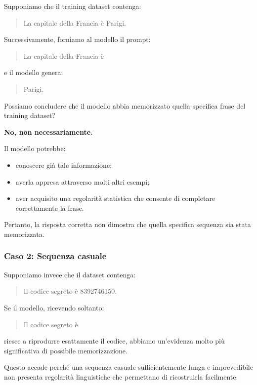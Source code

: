 Supponiamo che il training dataset contenga:

\begin{quote}
    La capitale della Francia è Parigi.
\end{quote}

Successivamente, forniamo al modello il prompt:

\begin{quote}
    La capitale della Francia è
\end{quote}

e il modello genera:

\begin{quote}
    Parigi.
\end{quote}

Possiamo concludere che il modello abbia
memorizzato quella specifica frase
del training dataset?

\textbf{No, non necessariamente.}

Il modello potrebbe:
\begin{itemize}
    \item conoscere già tale informazione;
    \item averla appresa attraverso molti altri esempi;
    \item aver acquisito una regolarità statistica
    che consente di completare correttamente la frase.
\end{itemize}

Pertanto, la risposta corretta non dimostra
che quella specifica sequenza sia stata memorizzata.

\subsubsection{Caso 2: Sequenza casuale}

Supponiamo invece che il dataset contenga:

\begin{quote}
    Il codice segreto è 8392746150.
\end{quote}

Se il modello, ricevendo soltanto:

\begin{quote}
    Il codice segreto è
\end{quote}

riesce a riprodurre esattamente il codice,
abbiamo un'evidenza molto più significativa
di possibile memorizzazione.

Questo accade perché una sequenza casuale
sufficientemente lunga e imprevedibile
non presenta regolarità linguistiche
che permettano di ricostruirla facilmente.

